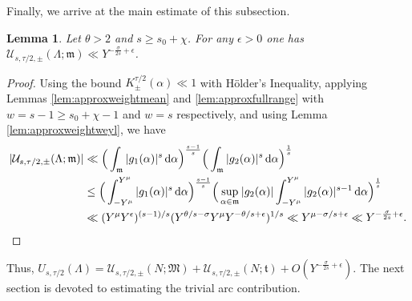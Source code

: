 \documentclass[11pt,reqno]{amsart}
\numberwithin{equation}{section}
\newtheorem{lemma}{Lemma}[section]
\renewcommand{\d}{\,{\rm d}}
\begin{document}
Finally, we arrive at the main estimate of this subsection. 

\begin{lemma} \label{lem:approxminorarcs}
Let $\theta > 2$ and $s \geq s_0+\chi$. For any $\epsilon > 0$ one has $\mathcal{U}_{s,\tau/2,\pm}(\Lambda;\mathfrak{m}) \ll Y^{-\frac{\sigma}{2s}+\epsilon}$. 
\end{lemma}

\begin{proof} Using the bound $K_{\pm}^{\tau/2}(\alpha) \ll 1$ with H\"{o}lder's Inequality, applying Lemmas \ref{lem:approxweightmean} and  \ref{lem:approxfullrange} with $w=s-1\geq s_0+\chi-1$ and $w = s$ respectively, and using Lemma \ref{lem:approxweightweyl}, we have 
\begin{align*} |\mathcal{U}_{s,\tau/2,\pm}(\Lambda;\mathfrak{m})| & \ll \Big( \int_{\mathfrak{m}} |g_1(\alpha)|^{s}\d\alpha \Big)^{\frac{s-1}{s}}\Big( \int_{\mathfrak{m}} |g_2(\alpha)|^{s}\d\alpha \Big)^{\frac{1}{s}} 
\\ 
& \leq \Big( \int_{-Y^{\mu}}^{Y^{\mu}} |g_1(\alpha)|^{s}\d\alpha \Big)^{\frac{s-1}{s}}\Big( \sup_{\alpha \in \mathfrak{m}} |g_2(\alpha)| \int_{-Y^{\mu}}^{Y^{\mu}} |g_2(\alpha)|^{s-1}\d\alpha \Big)^{\frac{1}{s}} 
\\ 
& \ll (Y^{\mu}Y^{\epsilon})^{(s-1)/s}(Y^{\theta/s-\sigma}Y^{\mu}Y^{-\theta/s+\epsilon})^{1/s} \ll Y^{\mu-\sigma/s+\epsilon} \ll Y^{-\frac{\sigma}{2s}+\epsilon}.
\end{align*}
\end{proof}

Thus, $U_{s,\tau/2}(\Lambda) = \mathcal{U}_{s,\tau/2,\pm}(N;\mathfrak{M})+\mathcal{U}_{s,\tau/2,\pm}(N;\mathfrak{t})+O(Y^{-\frac{\sigma}{2s}+\epsilon})$. The next section is devoted to estimating the trivial arc contribution. 
\end{document}
